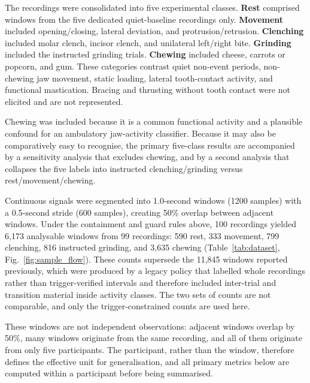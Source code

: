 \documentclass[pdflatex,sn-nature,iicol]{sn-jnl}
\begin{document}
The recordings were consolidated into five experimental classes. \textbf{Rest} comprised windows from the five dedicated quiet-baseline recordings only. \textbf{Movement} included opening/closing, lateral deviation, and protrusion/retrusion. \textbf{Clenching} included molar clench, incisor clench, and unilateral left/right bite. \textbf{Grinding} included the instructed grinding trials. \textbf{Chewing} included cheese, carrots or popcorn, and gum. These categories contrast quiet non-event periods, non-chewing jaw movement, static loading, lateral tooth-contact activity, and functional mastication. Bracing and thrusting without tooth contact were not elicited and are not represented.

Chewing was included because it is a common functional activity and a plausible confound for an ambulatory jaw-activity classifier. Because it may also be comparatively easy to recognise, the primary five-class results are accompanied by a sensitivity analysis that excludes chewing, and by a second analysis that collapses the five labels into instructed clenching/grinding versus rest/movement/chewing.

Continuous signals were segmented into 1.0-second windows (1200 samples) with a 0.5-second stride (600 samples), creating 50\% overlap between adjacent windows. Under the containment and guard rules above, 100 recordings yielded 6,173 analysable windows from 99 recordings: 590 rest, 333 movement, 799 clenching, 816 instructed grinding, and 3,635 chewing (Table~\ref{tab:dataset}, Fig.~\ref{fig:sample_flow}). These counts supersede the 11,845 windows reported previously, which were produced by a legacy policy that labelled whole recordings rather than trigger-verified intervals and therefore included inter-trial and transition material inside activity classes. The two sets of counts are not comparable, and only the trigger-constrained counts are used here.

These windows are not independent observations: adjacent windows overlap by 50\%, many windows originate from the same recording, and all of them originate from only five participants. The participant, rather than the window, therefore defines the effective unit for generalisation, and all primary metrics below are computed within a participant before being summarised.
\end{document}
